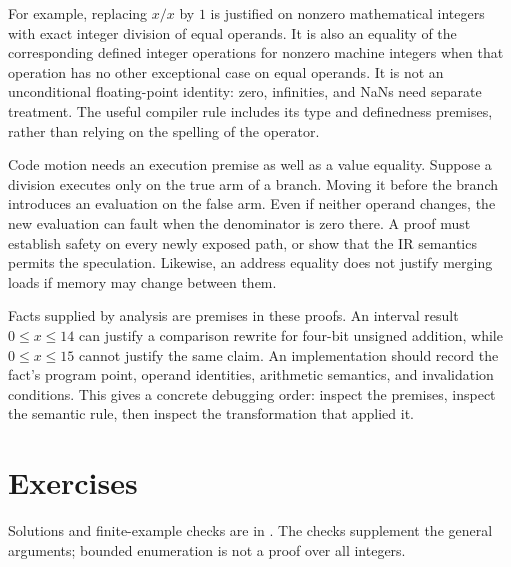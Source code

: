 For example, replacing $x/x$ by $1$ is justified on nonzero mathematical integers with exact integer division of equal operands.
It is also an equality of the corresponding defined integer operations for nonzero machine integers when that operation has no other exceptional case on equal operands.
It is not an unconditional floating-point identity: zero, infinities, and NaNs need separate treatment.
The useful compiler rule includes its type and definedness premises, rather than relying on the spelling of the operator.

Code motion needs an execution premise as well as a value equality.
Suppose a division executes only on the true arm of a branch.
Moving it before the branch introduces an evaluation on the false arm.
Even if neither operand changes, the new evaluation can fault when the denominator is zero there.
A proof must establish safety on every newly exposed path, or show that the IR semantics permits the speculation.
Likewise, an address equality does not justify merging loads if memory may change between them.

Facts supplied by analysis are premises in these proofs.
An interval result $0\leq x\leq14$ can justify a comparison rewrite for four-bit unsigned addition, while $0\leq x\leq15$ cannot justify the same claim.
An implementation should record the fact's program point, operand identities, arithmetic semantics, and invalidation conditions.
This gives a concrete debugging order: inspect the premises, inspect the semantic rule, then inspect the transformation that applied it.

\section{Exercises}
\label{sec:ch40-exercises}

Solutions and finite-example checks are in .
The checks supplement the general arguments; bounded enumeration is not a proof over all integers.

